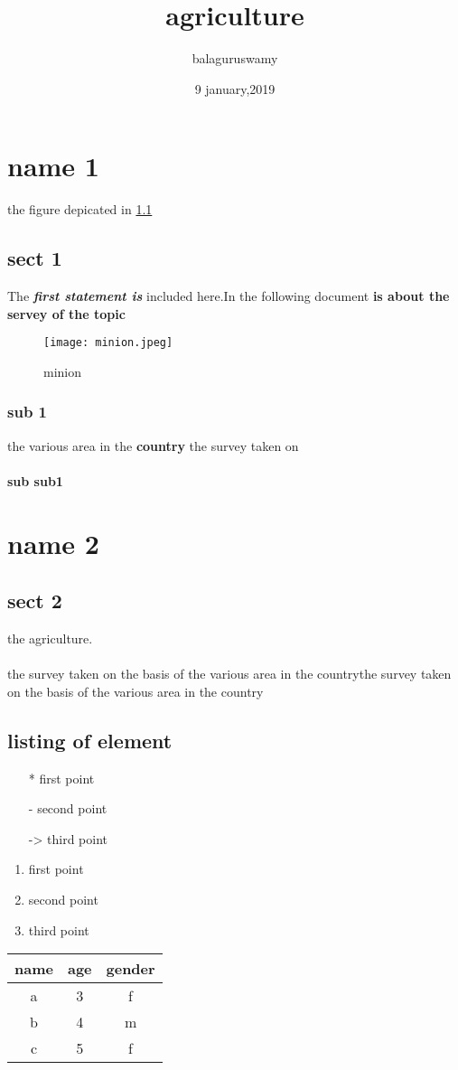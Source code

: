 \documentclass[12pt]{report} %
\begin{document}
\title{\textbf{agriculture}}
\author{balaguruswamy}
\date{9 january,2019}
\maketitle
\chapter{name 1}
the figure depicated in \ref{j}
\section*{sect 1}
	The \textbf{\textit{first statement is}} included here.In the following document\textbf{ is about the servey of the topic}
	\begin{figure}[h!]
		\centering
		\texttt{[image: minion.jpeg]}
		\caption{minion}
		\label{j}
	\end{figure}

\subsection{sub 1}the various area in the \textbf{country} the survey taken on

\subsubsection{sub sub1}
\chapter{name 2}
\section{sect 2}
 the agriculture.\\ \\the survey taken on the basis of the various area in the countrythe survey taken on the basis of the various area in the country
 \section{listing of element}
 \begin{itemize}
 	\item[*]  first point
 	\item[-]  second point
 	\item[->]  third point
 \end {itemize}
 	
 	
 \begin{enumerate}[label=\Alph*]
 	\item  first point
 \item  second point
 \item  third point
 \end{enumerate}

 \begin{center}
 \begin{tabular}{|c|c|c|}
 	\hline
 	name & age & gender\\
 	\hline
 	a & 3 & f \\
 	b & 4 & m \\
 	c & 5 & f \\
 	\hline
 \end{tabular}
\end{center}
 
\end{document}
